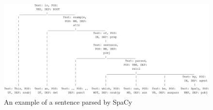 \begin{figure}[ht]
	\centering
	\includegraphics[width=\textwidth]{./images/sentence_example.pdf}
	\caption{An example of a sentence parsed by SpaCy}
	\label{fig:sentence_example}
\end{figure}

